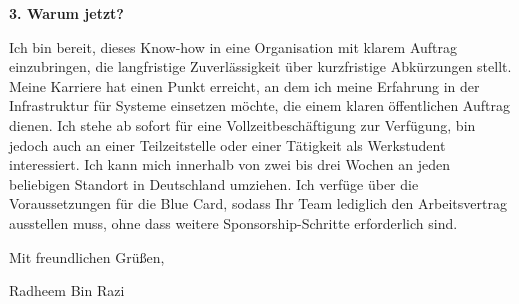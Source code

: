 \documentclass[11pt,a4paper]{coverletter}
\begin{document}
\vspace{8pt}\noindent\textbf{3. Warum jetzt?}\par\vspace{3pt}

Ich bin bereit, dieses Know-how in eine Organisation mit klarem Auftrag einzubringen, die langfristige Zuverlässigkeit über kurzfristige Abkürzungen stellt. Meine Karriere hat einen Punkt erreicht, an dem ich meine Erfahrung in der Infrastruktur für Systeme einsetzen möchte, die einem klaren öffentlichen Auftrag dienen. Ich stehe ab sofort für eine Vollzeitbeschäftigung zur Verfügung, bin jedoch auch an einer Teilzeitstelle oder einer Tätigkeit als Werkstudent interessiert. Ich kann mich innerhalb von zwei bis drei Wochen an jeden beliebigen Standort in Deutschland umziehen. Ich verfüge über die Voraussetzungen für die Blue Card, sodass Ihr Team lediglich den Arbeitsvertrag ausstellen muss, ohne dass weitere Sponsorship-Schritte erforderlich sind.

\closing{Mit freundlichen Grüßen,}{Radheem Bin Razi}
\end{document}
